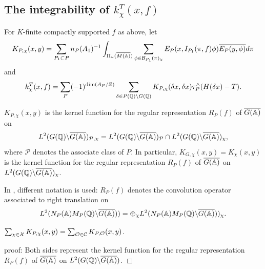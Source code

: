
\subsection{The integrability of $k_\chi ^T(x,f)$}

For $K$-finite compactly supported $f$ as above, let 
\begin{equation}
K_{P,\chi }(x,y)=\sum_{P_1\subset P}n_P(A_1)^{-1}
\int_{\Pi _u(\overline{M({\Bbb{A}})})}
\sum_{\phi \in {\cal{B}}_{P_1}(\pi )_\chi }
E_P(x,I_{P_1}(\pi ,f)\phi )\overline{E_P(y,\phi )}d\pi
\end{equation}
and 
\begin{equation}
k_\chi ^T(x,f)=\sum_P(-1)^{\dim (A_P/Z)}
\sum_{\delta \in P({\Bbb{Q}})\backslash G({\Bbb{Q}})}
K_{P,\chi }(\delta x,\delta x)\tau _P^{\wedge }(H(\delta x)-T).
\end{equation}

\begin{lemma}
$K_{P,\chi }(x,y)$ is the kernel function for the regular 
representation $R_P(f)$ of $\overline{G({\Bbb{A}})}$ on 
\[
L^2(G({\Bbb{Q}})\backslash \overline{G({\Bbb{A}})})_{\mathcal{P},\chi }
=L^2(G({\Bbb{Q}})\backslash \overline{G({\Bbb{A}})})_{\mathcal{P}}
\cap L^2(G({\Bbb{Q}})\backslash \overline{G({\Bbb{A}})})_{\chi},
\]
where $\mathcal{P}$ denotes the associate class of $P$. In particular,
$K_{G,\chi }(x,y)=K_\chi (x,y)$ is the kernel function for the regular
representation $R_P(f)$ of $\overline{G({\Bbb{A}})}$ on
\newline
$L^2(G({\Bbb{Q}})\backslash \overline{G({\Bbb{A}})})_\chi $.
\end{lemma}

\begin{remark} In \cite{A15}, different notation is used: $R_P(f)$ denotes
the convolution operator associated to right translation on
\[
L^2(N_P({\Bbb{A}})M_P({\Bbb{Q}})\backslash \overline{G({\Bbb{A}})}))
=\oplus_\chi
L^2(N_P({\Bbb{A}})M_P({\Bbb{Q}})\backslash \overline{G({\Bbb{A}})}))_\chi .
\]
\end{remark}

\begin{theorem}
$\sum_{\chi \in \mathcal{X}}K_{P,\chi }(x,y)
=\sum_{{\cal O}\in \mathcal{C}}
K_{P,{\cal O}}(x,y)$.
\end{theorem}

proof: Both sides represent the kernel function for the regular
representation $R_P(f)$ of $\overline{G({\Bbb{A}})}$
on $L^2(G({\Bbb{Q}})\backslash \overline{G({\Bbb{A}})})$. $\Box $

